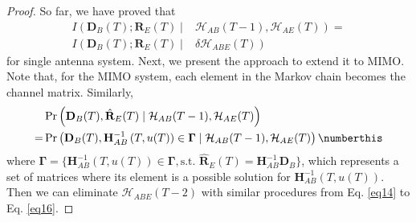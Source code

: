 \begin{proof}
So far, we have proved that 
\begin{align*}
    I\left(\mathbf{D}_B(T);\mathbf{R}_E(T) \mid \right. & \left. \mathcal{H}_{AB}(T-1),\mathcal{H}_{AE}(T)\right) =  \nonumber \\
    I\left(\mathbf{D}_B(T);\mathbf{R}_E(T) \mid \right. & \left. \delta \mathcal{H}_{ABE}(T)\right)
\end{align*}
for single antenna system. Next, we present the approach to extend it to MIMO. Note that, for the MIMO system, each element in the Markov chain becomes the channel matrix. Similarly,
\begin{subequations}
    \begin{align*}
        &\Pr\left(\mathbf{D}_B(T),\hat{\mathbf{R}}_E(T) \mid \mathcal{H}_{AB}(T-1),\mathcal{H}_{AE}(T)\right)\\
        = &\Pr\left(\mathbf{D}_B(T),\mathbf{H}_{AB}^{-1}\left(T,u(T)\right)\in\mathbf{\Gamma}\mid \mathcal{H}_{AB}(T-1), \mathcal{H}_{AE}(T)\right) \numberthis \label{eq13}
    \end{align*}
\end{subequations}
where $\mathbf{\Gamma} =\{\mathbf{H}_{AB}^{-1}\left(T,u(T)\right)\in\mathbf{\Gamma},\text{s.t.~} \hat{\mathbf{R}}_E(T) = \mathbf{H}_{AB}^{-1}\mathbf{D}_B\}$, which represents a set of matrices where its element is a possible solution for $\mathbf{H}_{AB}^{-1}\left(T,u(T)\right)$. Then we can eliminate $\mathcal{H}_{ABE}(T-2)$ with similar procedures from Eq. \eqref{eq14} to Eq. \eqref{eq16}.  

\end{proof}
